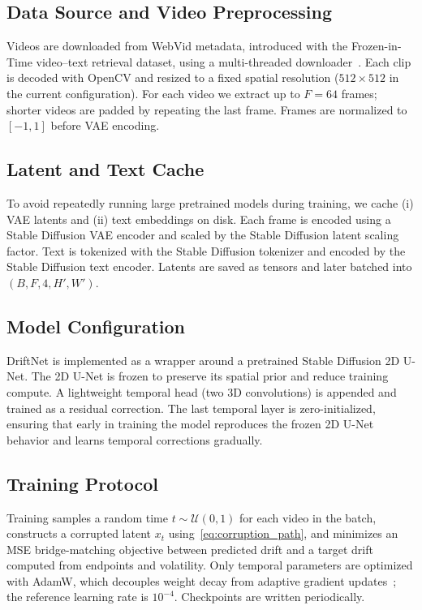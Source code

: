 \documentclass[journal]{IEEEtran}
\begin{document}
\subsection{Data Source and Video Preprocessing}
Videos are downloaded from WebVid metadata, introduced with the Frozen-in-Time video--text retrieval dataset, using a multi-threaded downloader~\cite{bain2021frozen}. Each clip is decoded with OpenCV and resized to a fixed spatial resolution ($512\times512$ in the current configuration). For each video we extract up to $F=64$ frames; shorter videos are padded by repeating the last frame. Frames are normalized to $[-1,1]$ before VAE encoding.

\subsection{Latent and Text Cache}
To avoid repeatedly running large pretrained models during training, we cache (i) VAE latents and (ii) text embeddings on disk. Each frame is encoded using a Stable Diffusion VAE encoder and scaled by the Stable Diffusion latent scaling factor. Text is tokenized with the Stable Diffusion tokenizer and encoded by the Stable Diffusion text encoder. Latents are saved as tensors and later batched into $(B,F,4,H',W')$.

\subsection{Model Configuration}
DriftNet is implemented as a wrapper around a pretrained Stable Diffusion 2D U-Net. The 2D U-Net is frozen to preserve its spatial prior and reduce training compute. A lightweight temporal head (two 3D convolutions) is appended and trained as a residual correction. The last temporal layer is zero-initialized, ensuring that early in training the model reproduces the frozen 2D U-Net behavior and learns temporal corrections gradually.

\subsection{Training Protocol}
Training samples a random time $t\sim\mathcal{U}(0,1)$ for each video in the batch, constructs a corrupted latent $x_t$ using~\eqref{eq:corruption_path}, and minimizes an MSE bridge-matching objective between predicted drift and a target drift computed from endpoints and volatility. Only temporal parameters are optimized with AdamW, which decouples weight decay from adaptive gradient updates~\cite{loshchilov2019adamw}; the reference learning rate is $10^{-4}$. Checkpoints are written periodically.
\end{document}
